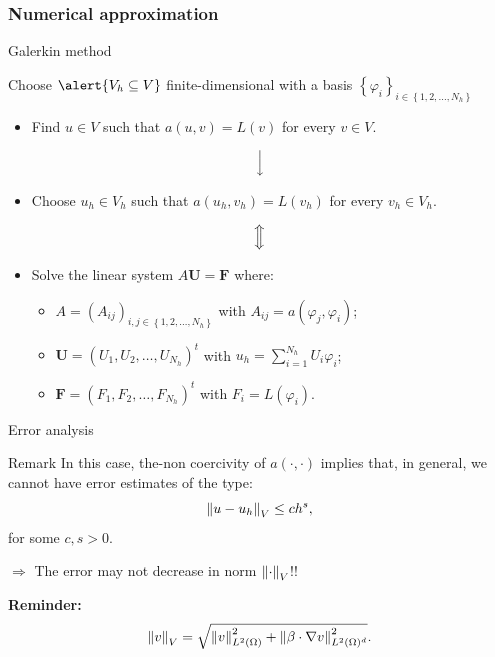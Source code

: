 \subsubsection{Numerical approximation}

\begin{frame}{Galerkin method}
	\begin{block}{}
	\begin{center}
	Choose $\alert{V_h\subseteq V}$ finite-dimensional with a basis $\left\{\varphi_i\right\}_{i\in\left\{1,2,\ldots,N_h \right\}}$
	\end{center}
	\end{block}
	
	\vspace*{-0.3cm}
	\begin{itemize}
	\item Find $u\in V$ such that $a(u,v)=L(v)$ for every $v\in V$.
	\end{itemize}
	\vspace*{0.1cm}
	$$\Big{\downarrow}$$
	\vspace*{-0.3cm}
	\begin{itemize}
	\item Choose $u_h\in V_h$ such that $a(u_h,v_h)=L(v_h)$ for every $v_h\in V_h$.
	\end{itemize}
	\vspace*{0.1cm}
	$$\Big{\Updownarrow}$$
	\vspace*{-0.3cm}
	\begin{itemize}
	\item Solve the linear system $A\mathbf{U}=\mathbf{F}$ where:
	\vspace*{0.3cm}
	\begin{itemize}
		\item $A=\left(A_{i j}\right)_{i, j\in\left\{1,2,\ldots,N_h\right\}}$ with $A_{i j}=a(\varphi_j,\varphi_i)$;
		\item $\mathbf{U}=\left(U_1,U_2,\ldots,U_{N_h}\right)^t$ with $u_h=\displaystyle\sum_{i=1}^{N_h}U_i\varphi_i$;
		\item $\mathbf{F}=\left(F_1,F_2,\ldots,F_{N_h}\right)^t$ with $F_i=L\left(\varphi_i\right)$.
	\end{itemize}
	\end{itemize}
\end{frame}

\begin{frame}{Error analysis}
	\begin{block}{Remark}
		In this case, the-non coercivity of $a(\cdot,\cdot)$ implies that, in general, we cannot have error estimates of the type:
		$$
		\left\|u-u_h\right\|_V\le c h^s,
		$$
		for some $c,s>0$.

		\vspace*{0.5cm}
		$\Longrightarrow$ \alert{The error may not decrease in norm $\left\|\cdot\right\|_{V}$!!}
		\vspace*{0.5cm}

		\textbf{Reminder:}
		$$
		\left\|v\right\|_V=\sqrt{\left\|v\right\|_{L^2(\Omega)}^2+\left\|\beta\cdot\nabla v\right\|_{L^2(\Omega)^d}^2}.
		$$
	\end{block}
\end{frame}

